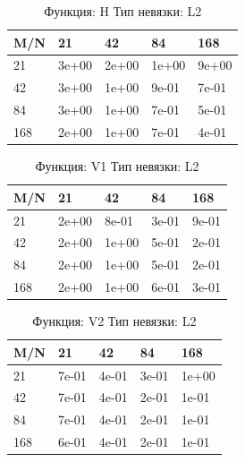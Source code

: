 \documentclass[a4paper,11pt]{article}
\begin{document}
\begin{table}[H]
\caption {Функция: H Тип невязки: L2  }
\begin{center}
\begin{tabular}{l|l|l|l|l}
\hline
M/N  & 21 & 42 & 84 & 168 \\ \hline
  21 & 3e+00& 2e+00& 1e+00& 9e+00\\ \hline
  42 & 3e+00& 1e+00& 9e-01& 7e-01\\ \hline
  84 & 3e+00& 1e+00& 7e-01& 5e-01\\ \hline
 168 & 2e+00& 1e+00& 7e-01& 4e-01\\ \hline
\end{tabular}
\end{center}
\end{table}
\begin{table}[H]
\caption {Функция: V1 Тип невязки: L2  }
\begin{center}
\begin{tabular}{l|l|l|l|l}
\hline
M/N  & 21 & 42 & 84 & 168 \\ \hline
  21 & 2e+00& 8e-01& 3e-01& 9e-01\\ \hline
  42 & 2e+00& 1e+00& 5e-01& 2e-01\\ \hline
  84 & 2e+00& 1e+00& 5e-01& 2e-01\\ \hline
 168 & 2e+00& 1e+00& 6e-01& 3e-01\\ \hline
\end{tabular}
\end{center}
\end{table}
\begin{table}[H]
\caption {Функция: V2 Тип невязки: L2  }
\begin{center}
\begin{tabular}{l|l|l|l|l}
\hline
M/N  & 21 & 42 & 84 & 168 \\ \hline
  21 & 7e-01& 4e-01& 3e-01& 1e+00\\ \hline
  42 & 7e-01& 4e-01& 2e-01& 1e-01\\ \hline
  84 & 7e-01& 4e-01& 2e-01& 1e-01\\ \hline
 168 & 6e-01& 4e-01& 2e-01& 1e-01\\ \hline
\end{tabular}
\end{center}
\end{table}
\newpage
\end{document}
